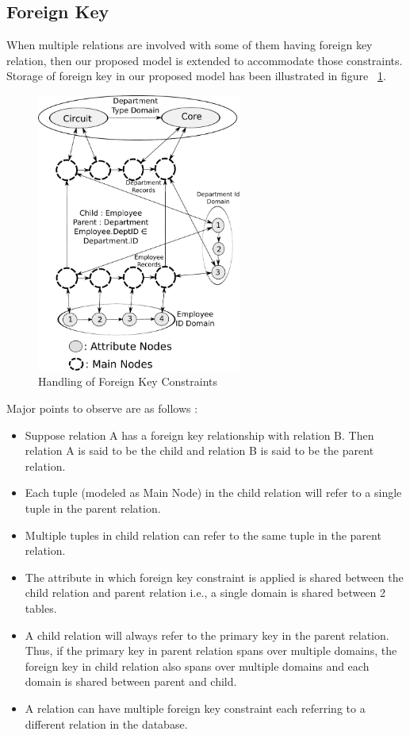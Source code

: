 \documentclass[12pt, oneside]{book}
\begin{document}
\subsection{Foreign Key}
When multiple relations are involved with some of them having foreign key relation, then our proposed model is extended to accommodate those constraints. Storage of foreign key in our proposed model has been illustrated in figure ~\ref{fig:foreign_key}.
\begin{figure}[h]
 \centering
 \includegraphics[width=0.6\textwidth]{pics/foreign_key.pdf}
 \caption{Handling of Foreign Key Constraints}
 \label{fig:foreign_key}
\end{figure}
Major points to observe are as follows :
\begin{itemize}
 \item Suppose relation A has a foreign key relationship with relation B. Then relation A is said to be the child and relation B is said to be the parent relation.
 \item Each tuple (modeled as Main Node) in the child relation will refer to a single tuple in the parent relation.
 \item Multiple tuples in child relation can refer to the same tuple in the parent relation.
 \item The attribute in which foreign key constraint is applied is shared between the child relation and parent relation i.e., a single domain is shared between 2
 tables.
 \item A child relation will always refer to the primary key in the parent relation. Thus, if the primary key in parent relation spans over multiple domains, the foreign key in child relation also spans over multiple domains and each domain is shared between parent and child.
 \item A relation can have multiple foreign key constraint each referring to a different relation in the database.
\end{itemize}
\end{document}
